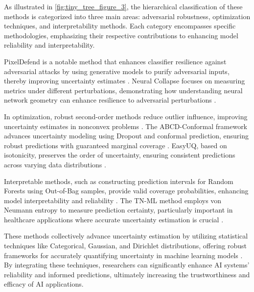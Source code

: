 As illustrated in \autoref{fig:tiny_tree_figure_3}, the hierarchical classification of these methods is categorized into three main areas: adversarial robustness, optimization techniques, and interpretability methods. Each category encompasses specific methodologies, emphasizing their respective contributions to enhancing model reliability and interpretability.

PixelDefend is a notable method that enhances classifier resilience against adversarial attacks by using generative models to purify adversarial inputs, thereby improving uncertainty estimates \cite{song2018pixeldefendleveraginggenerativemodels}. Neural Collapse focuses on measuring metrics under different perturbations, demonstrating how understanding neural network geometry can enhance resilience to adversarial perturbations \cite{su2024robustnessneuralcollapseneural}.

In optimization, robust second-order methods reduce outlier influence, improving uncertainty estimates in nonconvex problems \cite{li2024robustsecondordernonconvexoptimization}. The ABCD-Conformal framework advances uncertainty modeling using Dropout and conformal prediction, ensuring robust predictions with guaranteed marginal coverage \cite{baragatti2024approximatebayesiancomputationdeep}. EasyUQ, based on isotonicity, preserves the order of uncertainty, ensuring consistent predictions across varying data distributions \cite{walz2023easyuncertaintyquantificationeasyuq}.

Interpretable methods, such as constructing prediction intervals for Random Forests using Out-of-Bag samples, provide valid coverage probabilities, enhancing model interpretability and reliability \cite{ramosaj2021interpretablemachinesconstructingvalid}. The TN-ML method employs von Neumann entropy to measure prediction certainty, particularly important in healthcare applications where accurate uncertainty estimation is crucial \cite{an2023intelligentdiagnosticschemelung}.

These methods collectively advance uncertainty estimation by utilizing statistical techniques like Categorical, Gaussian, and Dirichlet distributions, offering robust frameworks for accurately quantifying uncertainty in machine learning models \cite{valdenegrotoro2021teachinguncertaintyquantificationmachine}. By integrating these techniques, researchers can significantly enhance AI systems' reliability and informed predictions, ultimately increasing the trustworthiness and efficacy of AI applications.

